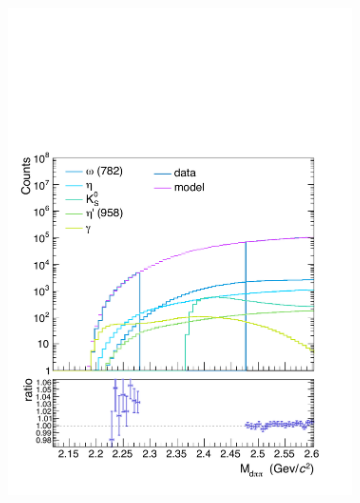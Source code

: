 \begin{figure}
\begin{subfigure}{.33\textwidth}
  \centering
  \captionsetup{justification=centering}
  \includegraphics[width=\linewidth]{gfx/can0}
  \caption{}
  \label{fig:tem01}
\end{subfigure}%
\begin{subfigure}{.33\textwidth}
  \centering
  \captionsetup{justification=centering}

\end{subfigure}
\end{figure}
